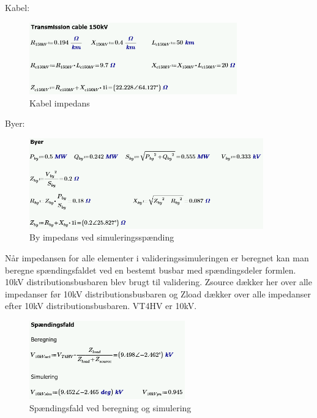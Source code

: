 Kabel:
\begin{figure}[H] %
	\centering
	\includegraphics[width=0.8\textwidth]{figurer/Kabel_validering}
	\caption{Kabel impedans}
	\label{fig:Kabelimpedans}
\end{figure}

Byer:
\begin{figure}[H] %
	\centering
	\includegraphics[width=0.9\textwidth]{figurer/By_validering}
	\caption{By impedans ved simuleringsspænding}
	\label{fig:Byimpedans}
\end{figure}

 Når impedansen for alle elementer i valideringssimuleringen er beregnet kan man beregne spændingsfaldet ved en bestemt busbar med spændingsdeler formlen. 10kV distributionsbusbaren blev brugt til validering. Zsource dækker her over alle impedanser før 10kV distributionsbusbaren og Zload dækker over alle impedanser efter 10kV distributionsbusbaren. VT4HV er 10kV.
 
 \begin{figure}[H] %
 	\centering
 	\includegraphics[width=0.6\textwidth]{figurer/Spaendingsfald_validering}
 	\caption{Spændingsfald ved beregning og simulering}
 	\label{fig:Spaendingsfald_validering}
 \end{figure}
 
